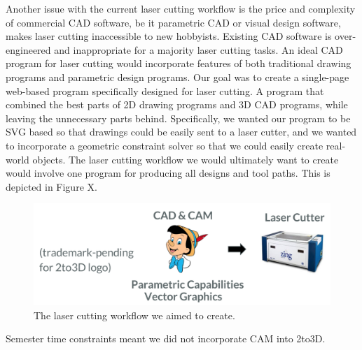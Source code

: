 Another issue with the current laser cutting workflow is the price and complexity of commercial CAD software, be it parametric CAD or visual design software, makes laser cutting inaccessible to new hobbyists. Existing CAD software is over-engineered and inappropriate for a majority laser cutting tasks. An ideal CAD program for laser cutting would incorporate features of both traditional drawing programs and parametric design programs. Our goal was to create a single-page web-based program specifically designed for laser cutting. A program that combined the best parts of 2D drawing programs and 3D CAD programs, while leaving the unnecessary parts behind. Specifically, we wanted our program to be SVG based so that drawings could be easily sent to a laser cutter, and we wanted to incorporate a geometric constraint solver so that we could easily create real-world objects. The laser cutting workflow we would ultimately want to create would involve one program for producing all designs and tool paths. This is depicted in Figure X.

\begin{figure}[h]
  \includegraphics[width=\linewidth]{2to3DWorkflow.jpg}
  \caption{The laser cutting workflow we aimed to create.}
  \label{fig:2to3DWorkflow}
\end{figure}

Semester time constraints meant we did not incorporate CAM into 2to3D.